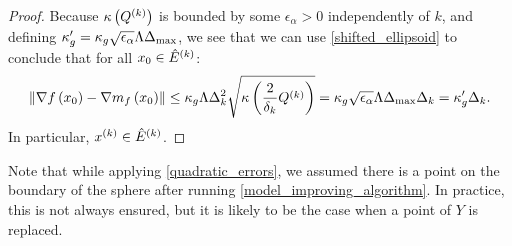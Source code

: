 \begin{proof}




Because ${\kappa} \left({Q^{(k)}}\right)$ is bounded by some $\epsilon_{\alpha} > 0$ independently of $k$,
and defining $\kappa'_{g} =  \kappa_g\sqrt{\epsilon_{\alpha}}\Lambda{\Delta_{\textrm{max}}}$, we see that
we can use  \cref{shifted_ellipsoid} to conclude that for all $x_0 \in {{\hat E}^{(k)}}$:
\begin{align*}
\left\|\nabla f\left(x_0 \right) - \nabla m_f\left(x_0\right)\right\| \le 
\kappa_g  \Lambda\Delta_k^2 \sqrt{{\kappa} \left(\frac 2 {\delta_k} Q^{(k)}\right)}
=  \kappa_g \sqrt{\epsilon_{\alpha}}\Lambda{\Delta_{\textrm{max}}}\Delta_k 
= \kappa'_g\Delta_k.
\end{align*}
In particular, $x^{(k)} \in {{\hat E}^{(k)}}$.
\end{proof}

Note that while applying \cref{quadratic_errors},
we assumed there is a point on the boundary of the sphere after running
\cref{model_improving_algorithm}.
In practice, this is not always ensured, but it is likely to be the case when a point of $Y$ is replaced.


